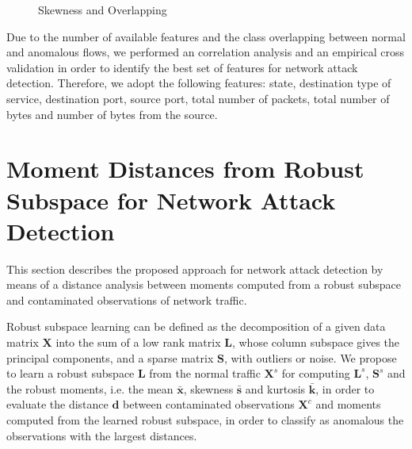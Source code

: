 \begin{figure}[!htb]
	\centering
	\caption[Skewness and Overlapping]{Skewness and Overlapping}
	\label{fig:4.10}
\end{figure}

Due to the number of available features and the class overlapping between normal and anomalous flows, we performed an correlation analysis and an empirical cross validation in order to identify the best set of features for network attack detection. Therefore, we adopt the following features: state, destination type of service, destination port, source port, total number of packets, total number of bytes and number of bytes from the source.


\section{Moment Distances from Robust Subspace for Network Attack Detection}
\label{sec:4_proposal}

This section describes the proposed approach for network attack detection by means of a distance analysis between moments computed from a robust subspace and contaminated observations of network traffic. 

Robust subspace learning can be defined as the decomposition of a given data matrix $\pmb{X}$ into the sum of a low rank matrix $\pmb{L}$, whose column subspace gives the principal components, and a sparse matrix $\pmb{S}$, with outliers or noise. We propose to learn a robust subspace $\pmb{L}$ from the normal traffic $\pmb{X}^s$ for computing $\pmb{L}^s$, $\pmb{S}^s$ and the robust moments, i.e. the mean $\bar{\pmb{x}}$, skewness $\bar{\pmb{s}}$ and kurtosis $\bar{\pmb{k}}$, in order to evaluate the distance $\pmb{d}$ between contaminated observations $\pmb{X}^c$ and moments computed from the learned robust subspace, in order to classify as anomalous the observations with the largest distances.

